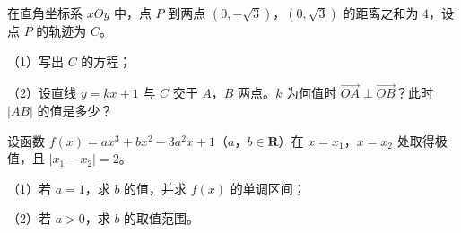 \begin{question}
在直角坐标系 $xOy$ 中，点 $P$ 到两点 $(0,-\sqrt3)$，$(0,\sqrt3)$ 的距离之和为 $4$，设点 $P$ 的轨迹为 $C$。

（1）写出 $C$ 的方程；

（2）设直线 $y=kx+1$ 与 $C$ 交于 $A$，$B$ 两点。$k$ 为何值时 $\overrightarrow{OA}\perp\overrightarrow{OB}$？此时 $\left|AB\right|$ 的值是多少？

\end{question}
\begin{question}
设函数 $f(x)=ax^3+bx^2-3a^2x+1$（$a$，$b\in\mathbf R$）在 $x=x_1$，$x=x_2$ 处取得极值，且 $|x_1-x_2|=2$。

（1）若 $a=1$，求 $b$ 的值，并求 $f(x)$ 的单调区间；

（2）若 $a>0$，求 $b$ 的取值范围。

\end{question}